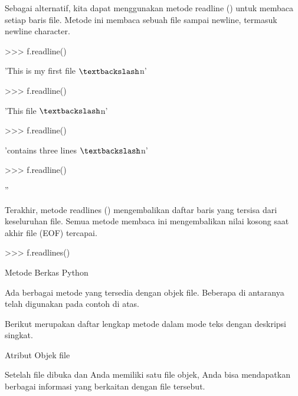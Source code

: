 \vspace{12pt}
\noindent 
Sebagai alternatif, kita dapat menggunakan metode readline () untuk membaca setiap baris file. Metode ini membaca sebuah file sampai newline, termasuk newline character. \par
\vspace{12pt}
\noindent 
>>> f.readline() \par
\noindent 
'This is my first file $  \textbackslash  $n' \par
\vspace{12pt}
\noindent 
>>> f.readline() \par
\noindent 
'This file $  \textbackslash  $n' \par
\vspace{12pt}
\noindent 
>>> f.readline() \par
\noindent 
'contains three lines $  \textbackslash  $n' \par
\vspace{12pt}
\noindent 
>>> f.readline() \par
\noindent 
'' \par
\vspace{16pt}
\noindent 
Terakhir, metode readlines () mengembalikan daftar baris yang tersisa dari keseluruhan file. Semua metode membaca ini mengembalikan nilai kosong saat akhir file (EOF) tercapai. \par
\vspace{12pt}
\noindent 
>>> f.readlines() \par
{} \par
\vspace{12pt}
\vspace{12pt}
\noindent 
Metode Berkas Python \par
\vspace{12pt}
\noindent 
Ada berbagai metode yang tersedia dengan objek file. Beberapa di antaranya telah digunakan pada contoh di atas. \par
\vspace{12pt}
\noindent 
Berikut merupakan daftar lengkap metode dalam mode teks dengan deskripsi singkat. \par
\vspace{12pt}
\noindent 
Atribut Objek file \par
\vspace{12pt}
\noindent 
Setelah file dibuka dan Anda memiliki satu file objek, Anda bisa mendapatkan berbagai informasi yang berkaitan dengan file tersebut. \par
